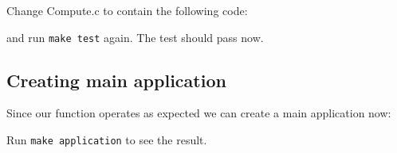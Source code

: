 \documentclass[a4paper,12pt]{article}
\begin{document}
Change Compute.c to contain the following code:



and run \verb/make test/ again.  The test should pass now.

\subsection{Creating main application}

Since our function operates as expected we can create a main
application now:



Run \verb/make application/ to see the result.
\end{document}
